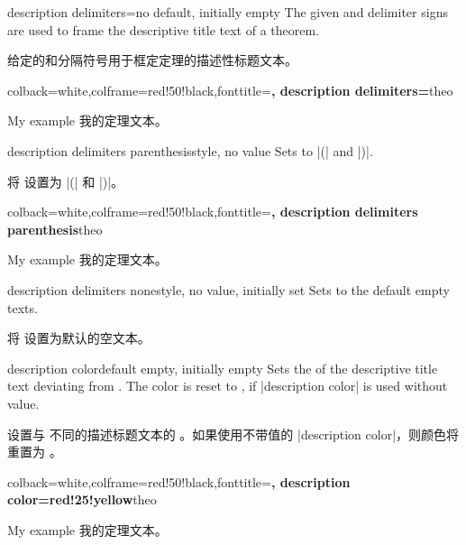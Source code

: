 \begin{docTcbKey}{description delimiters}{=}{no default, initially empty}
The given  and  delimiter signs are used to frame
the descriptive title text of a theorem.

给定的和分隔符号用于框定定理的描述性标题文本。
\begin{dispExample}
%
  {colback=white,colframe=red!50!black,fonttitle=\bfseries,
   description delimiters={\flqq}{\frqq}}{theo}
\begin{sometheorem}{My example}{}
我的定理文本。
\end{sometheorem}
\end{dispExample}
\end{docTcbKey}


\begin{docTcbKey}{description delimiters parenthesis}{}{style, no value}
Sets  to |(| and |)|.

将  设置为 |(| 和 |)|。
\begin{dispExample}
%
  {colback=white,colframe=red!50!black,fonttitle=\bfseries,
   description delimiters parenthesis}{theo}
\begin{sometheorem}{My example}{}
我的定理文本。
\end{sometheorem}
\end{dispExample}
\end{docTcbKey}


\begin{docTcbKey}{description delimiters none}{}{style, no value, initially set}
Sets  to the default empty texts.

将  设置为默认的空文本。
\end{docTcbKey}


\begin{docTcbKey}{description color}{}{default empty, initially empty}
Sets the  of the descriptive title text deviating from .
The color is reset to , if |description color| is used without value.

设置与  不同的描述标题文本的 。如果使用不带值的 |description color|，则颜色将重置为 。
\begin{dispExample}
%
  {colback=white,colframe=red!50!black,fonttitle=\bfseries,
   description color=red!25!yellow}{theo}
\begin{sometheorem}{My example}{}
我的定理文本。
\end{sometheorem}
\end{dispExample}
\end{docTcbKey}

